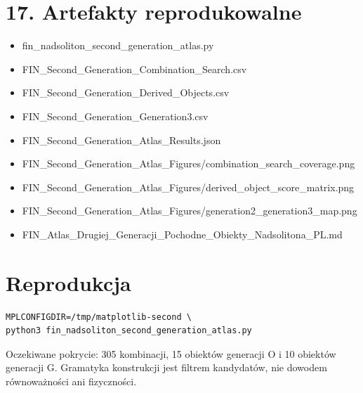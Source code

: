 \documentclass[11pt,a4paper,openany]{report}
\begin{document}
\chapter{17. Artefakty reprodukowalne}

\begin{itemize}
\item 
fin\_nadsoliton\_second\_generation\_atlas.py

\item 
FIN\_Second\_Generation\_Combination\_Search.csv

\item 
FIN\_Second\_Generation\_Derived\_Objects.csv

\item 
FIN\_Second\_Generation\_Generation3.csv

\item 
FIN\_Second\_Generation\_Atlas\_Results.json

\item 
FIN\_Second\_Generation\_Atlas\_Figures/\allowbreak{}combination\_search\_coverage.png

\item 
FIN\_Second\_Generation\_Atlas\_Figures/\allowbreak{}derived\_object\_score\_matrix.png

\item 
FIN\_Second\_Generation\_Atlas\_Figures/\allowbreak{}generation2\_generation3\_map.png

\item 
FIN\_Atlas\_Drugiej\_Generacji\_Pochodne\_Obiekty\_Nadsolitona\_PL.md

\end{itemize}


\clearpage
\chapter*{Reprodukcja}
\begin{Verbatim}[fontsize=\small]
MPLCONFIGDIR=/tmp/matplotlib-second \
python3 fin_nadsoliton_second_generation_atlas.py
\end{Verbatim}
Oczekiwane pokrycie: 305 kombinacji, 15 obiektów generacji O i 10 obiektów
generacji G.  Gramatyka konstrukcji jest filtrem kandydatów, nie dowodem
równoważności ani fizyczności.
\end{document}
